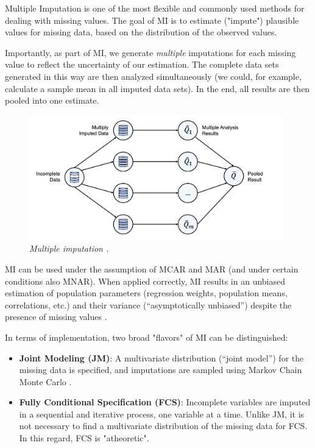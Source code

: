 Multiple Imputation \citep[MI;][]{rubin1996multiple, rubin2004multiple} is one of the most flexible and commonly used methods for dealing with missing values. The goal of MI is to estimate ("impute") plausible values for missing data, based on the distribution of the observed values. 

Importantly, as part of MI, we generate \emph{multiple} imputations for each missing value to reflect the uncertainty of our estimation. The complete data sets generated in this way are then analyzed simultaneously (we could, for example, calculate a sample mean in all imputed data sets). In the end, all results are then pooled into one estimate. 


\begin{figure}[H]
\includegraphics[width=11cm]{images/mi.png}
\captionsetup{labelformat=empty} 
\centering
\caption{\emph{Multiple imputation \citep[adapted from][]{van2011mice}.}}
\end{figure}

MI can be used under the assumption of MCAR and MAR (and under certain conditions also MNAR). When applied correctly, MI results in an unbiased estimation of population parameters (regression weights, population means, correlations, etc.) and their variance (“asymptotically unbiased”) despite the presence of missing values \citep{White2011}.

In terms of implementation, two broad "flavors" of MI can be distinguished:

\begin{itemize}
    \item \textbf{Joint Modeling (JM)}: A multivariate distribution (“joint model”) for the missing data is specified, and imputations are sampled using Markov Chain Monte Carlo \citep[MCMC;][]{schafer1997analysis}.
    \item \textbf{Fully Conditional Specification (FCS)}: Incomplete variables are imputed in a sequential and iterative process, one variable at a time. Unlike JM, it is not necessary to find a multivariate distribution of the missing data for FCS. In this regard, FCS is "atheoretic".
\end{itemize}

